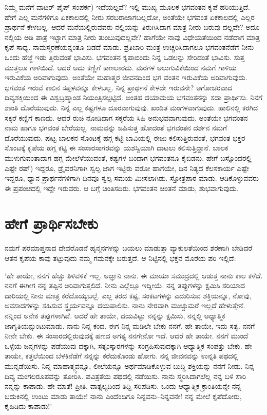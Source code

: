 ನಿಮ್ಮ ಮನೆಗೆ ವಾಟರ್ ಪೈಪ್ ಸಂಪರ್ಕ) ಇದೆಯಲ್ಲವೆ? ಇಲ್ಲಿ ಮುಖ್ಯ ಮೂಲಕ ಭಗವಂತನ ಕೃಪೆ ಹರಿಯುತ್ತಿದೆ. ಹೇಗೆ ಎಲ್ಲ ಮನೆಗಳಿಗೂ ಏಕಕಾಲದಲ್ಲಿ ನೀರು ಸರಬರಾಜಾಗಬಲ್ಲದೋ, ಅಂತೆಯೇ ಭಗವಂತ ಏಕಕಾಲದಲ್ಲಿ ಎಲ್ಲರ ಪ್ರಾರ್ಥನೆ ಕೇಳಬಲ್ಲ. ಆದರೆ ಮನೆಯಲ್ಲಿರುವವರು ನಲ್ಲಿಯನ್ನು ತಿರುಗಿಸಿದಾಗ ಮಾತ್ರ ನೀರು ಬರುವು ದಲ್ಲವೇ? ಅದೂ ನಲ್ಲಿಯ ಅಡಿ ಪಾತ್ರೆ ಇಟ್ಟಾಗ ಮಾತ್ರ ನೀರು ತುಂಬುವುದಲ್ಲವೇ? ಹಾಗೆಯೇ ನಾವು ವಿಧೇಯತೆಯಿಂದ ನಡೆದಾಗ ಮಾತ್ರ ಕೃಪೆ ಸಾಧ್ಯ. ನಾಮಸ್ಮರಣೆಯನ್ನಂತೂ ಬಿಡದೆ ಮಾಡು. ಪ್ರತಿಬಾರಿ ಮಂತ್ರ ಉಚ್ಚರಿಸಿದಾಗಲೂ ಭಗವಂತನೆಡೆಗೆ ನೀನು ಒಂದು ಹೆಜ್ಜೆ ಇಡು ತ್ತಿರುವಂತೆ ಭಾವಿಸು. ಭಗವಂತನ ಕೃಪಾಬಿಂದು ನಿನ್ನ ಒಡಲನ್ನು ಸೇರಿದಂತೆ ಭಾವಿಸು. ಸುತ್ತ ಮುತ್ತಲೂ ಗಾಳಿಯಿದೆ. ಆದರೆ ಅದು ಕಣ್ಣಿಗೆ ಕಾಣಲಾರದು. ಮರಗಳ ಅಲುಗುವಿಕೆಯಿಂದ ನಮಗೆ ಗಾಳಿಯ ಇರುವಿಕೆಯ ಅರಿವಾಗುವುದು. ಅಂತೆಯೇ ಮಹಾತ್ಮರ ಜೀವನದಿಂದ ಭಗ ವಂತನ ಇರುವಿಕೆಯ ಅರಿವಾಗುವುದು. ಭಗವಂತ ಇರುವೆ ಕಾಲಿನ ಸಪ್ಪಳವನ್ನೂ ಕೇಳಬಲ್ಲ. ನಿನ್ನ ಪ್ರಾರ್ಥನೆ ಕೇಳದೇ ಇರುವನೇ? ಅಗೋಚರವಾದ ದಿವ್ಯಶಕ್ತಿಯಿಂದ ಈ ವಿಶ್ವಬ್ರಹ್ಮಾಂಡ ನಿಯಂತ್ರಿಸಲ್ಪಟ್ಟಿದೆ. ಅಂತಹ ದಯಾಮಯ ಭಗವಂತನನ್ನು ಸದಾ ಪ್ರಾರ್ಥಿಸು. ನಿನಗೆ ಶಾಂತಿ ದೊರೆಯುವುದು. ನಿನ್ನ ಎಲ್ಲ ಕಷ್ಟಗಳೂ ದೂರವಾಗುವುವು. ಖಂಡಿತ ಮಂಗಳವಾಗುವುದು. ಹಾಲಿನಲ್ಲಿ ಕರಗಿದ ಸಕ್ಕರೆ ಕಣ್ಣಿಗೆ ಕಾಣದು. ಆದರೆ ರುಚಿ ನೋಡಿದಾಗ ಸಕ್ಕರೆಯ ಸಿಹಿ ಅನುಭವವಾಗುವುದು. ಅಂತೆಯೇ ಭಗವಂತನ ನಾಮ ಹಾಗೂ ಭಗವಂತ ಬೇರೆಯಲ್ಲ. ನಾಮವನ್ನು ಜಪಿಸುತ್ತ ಹೋದಂತೆ ಭಗವಂತನ ದರ್ಶನ ನಮಗೆ ದೊರೆಯುವುದು. ಪುಟ್ಟ ಬಾಲಕನ ಸೊಂಟಕ್ಕೆ ಹಗ್ಗ ಕಟ್ಟಿ ಬಾವಿಯಲ್ಲಿ ಈಜು ಕಲಿಸುತ್ತಿರುವಂತೆ, ಭಗವಂತ ಭಕ್ತರ ಸೊಂಟಕ್ಕೆ ಕೃಪೆಯ ಹಗ್ಗ ಕಟ್ಟಿ ಈ ಸಂಸಾರಸಾಗರವನ್ನು ಯಶಸ್ವಿಯಾಗಿ ದಾಟಲು ಕಲಿಸುತ್ತಿದ್ದಾನೆ. ಬಾಲಕ ಮುಳುಗುವಂತಾದಾಗ ಹಗ್ಗ ಮೇಲೆಳೆಯುವಂತೆ, ಕಷ್ಟಗಳ ಬಂದಾಗ ಭಗವಂತನೂ ಕೈಬಿಡನು. ಹೇಗೆ ಬಸ್ಸೊಂದರಲ್ಲಿ ಎಷ್ಟೇ ರಷ್​) ಇದ್ದರೂ, ಡ್ರೈವರನಿಗಾಗಿ ಸ್ವಲ್ಪ ಜಾಗ ಇಟ್ಟಿರು ವರೋ ಹಾಗೆಯೇ, ದಿನ ನಿತ್ಯದ ಕೆಲಸಕಾರ್ಯ ಎಷ್ಟೇ ಇದ್ದರೂ, ಧ್ಯಾನ ಪ್ರಾರ್ಥನೆಗಳಿಗಾಗಿ ದಿನವೂ ಸ್ವಲ್ಪ ಸಮಯ ಮೀಸಲಾಗಿಡು. ಸ್ತೋತ್ರಪಾಠ ಮಾಡು. ಆಡಿಕೊಳ್ಳುವವರು ಈ ಪ್ರಪಂಚದಲ್ಲಿ ಇದ್ದೇ ಇರುವರು. ಆ ಬಗ್ಗೆ ಚಿಂತಿಸದಿರು. ಭಗವಂತನ ಚಿಂತನೆ ಮಾಡು, ಶುಭವಾಗುವುದು.


\section{ಹೇಗೆ ಪ್ರಾರ್ಥಿಸಬೇಕು}

ನಮಗೆ ಪರಮಾಪ್ತನಾದ ದೇವರೊಡನೆ ಹೃನ್ಮನಗಳನ್ನು ಬಯಲು ಮಾಡುತ್ತಾ ವ್ಯಾಕುಲತೆಯಿಂದ ಶರಣಾಗಿ ಬೇಡಿದರೆ ಆತನ ಕೃಪೆಯ ಕಾವು ತಟ್ಟುವುದು ನಮ್ಮ ಗಮನಕ್ಕೇ ಬರುತ್ತದೆ. ಆ ನಿಟ್ಟಿನಲ್ಲಿ ಭಕ್ತನ ಮೊರೆಯ ಪರಿ ಇಲ್ಲಿದೆ:

‘ಹೇ ತಾಯೇ, ನನಗೆ ಹೆಚ್ಚು ತಿಳಿವಳಿಕೆ ಇಲ್ಲ. ಅಜ್ಞಾನಿ ನಾನು. ಈ ಮಾಯಾ ಸಮುದ್ರದಲ್ಲಿ ಆಡುತ್ತ ನಾನು ಕಾಲ ಕಳೆದೆ. ನನಗೆ ಈಗೀಗ ನನ್ನ ತಪ್ಪಿನ ಅರಿವಾಗುತ್ತಲಿದೆ. ನೀನು ಎಲ್ಲೆಲ್ಲೂ ಇದ್ದೀಯೆ. ನನ್ನ ತಪ್ಪುಗಳನ್ನು ಕ್ಷಮಿಸಿ ಸರಿಯಾದ ದಾರಿಯಲ್ಲಿ ನೀನು ಮಾತ್ರ ಕರೆದೊಯ್ಯಬಲ್ಲೆ. ಎಲ್ಲ ತರದ ಕಷ್ಟ, ಸಂಕಟಗಳನ್ನು ಎದುರಿಸುವ ಶಕ್ತಿಯನ್ನೂ, ನೋವು, ಅವಸಾದಗಳನ್ನು ಸಹಿಸುವ ಸ್ಥೈರ್ಯವನ್ನೂ ದಯಪಾಲಿಸು. ನಾನು ನೇರವಾಗಿ ಮುಚ್ಚುಮರೆ ಇಲ್ಲದೆ ಹೇಳುತ್ತೇನೆ. ನನ್ನಿಂದ ಅನೇಕ ತಪ್ಪುಗಳಾಗಿವೆ. ಆದರೆ ಹೇ ತಾಯೇ, ದಯವಿಟ್ಟು ನನ್ನನ್ನು ಕ್ಷಮಿಸು, ನನ್ನಲ್ಲಿ ಆಧ್ಯಾತ್ಮಿಕ ಜಾಗೃತಿಯನ್ನುಂಟುಮಾಡು. ನಾನು ನಿನ್ನ ಕಂದ. ಈಗ ನಿನ್ನ ಮಡಿಲೇ ಬೇಕು ನನಗೆ. ಹೇ ತಾಯೇ, ಇದು ಸತ್ಯ. ನನಗೆ ನೀನೇ ಬೇಕು. ಈ ಸಂಸಾರದಲ್ಲಿರುವುದಕ್ಕೆ ಹಣದ ಅಗತ್ಯ ನನಗೇನೋ ಇದೆ. ಆದರೆ ಹೇ ತಾಯೇ. ನನಗೆ ಮುಂದೆ ಒಳ್ಳೆಯ ಜನ್ಮಗಳನ್ನು ಪಡೆಯುವು ದಕ್ಕಾಗಿ, ಸತ್ಸಂಸ್ಕಾರಗಳನ್ನು ಸಂಗ್ರಹಿಸುವುದಕ್ಕಾಗಿ ಆಧ್ಯಾತ್ಮಿಕ ಸಂಪತ್ತು ಬೇಕು. ಹೇ ತಾಯೇ, ಕತ್ತಲೆಯಿಂದ ಬೆಳಕಿನೆಡೆಗೆ ನನ್ನನ್ನು ಕರೆದುಕೊಂಡು ಹೋಗು. ನನ್ನ ಜೀವನವನ್ನು ಉನ್ನತಿ ಪಥದಲ್ಲಿ ಮುನ್ನಡೆಯಿಸು. ನಿನ್ನ ಮಾಹಾತ್ಮ್ಯವನ್ನೂ, ಲೀಲೆಯನ್ನೂ ಅರ್ಥಮಾಡಿಕೊಳ್ಳುವ ಬುದ್ಧಿ ಶಕ್ತಿಯನ್ನು ನನಗೆ ನೀಡು. ನಿನ್ನ ದಿವ್ಯ ಮಂಗಲರೂಪವನ್ನು ತೋರಿಸಿ. ಪವಿತ್ರತೆಯ ಪಥದಲ್ಲಿ ನಡೆಯಿಸು. ನಾನು ಸ್ಮರಿಸಿದಾಗಲೆಲ್ಲ ನನ್ನ ಬಳಿ ಸಾರಿ ನನ್ನನ್ನು ಕಾಪಾಡು. ಹೇ ಮಾತೆ! ಪ್ರೀತಿ, ವಾತ್ಸಲ್ಯದಿಂದ ತಿದ್ದಿ ಸರಿಪಡಿಸು. ಒಂದು ಆಧ್ಯಾತ್ಮಿಕ ಕ್ರಾಂತಿಯನ್ನೇ ನನ್ನ ಬದುಕಿನಲ್ಲಿ ಉಂಟು ಮಾಡು ತಾಯೇ! ನಾನು ಎಂದೆಂದಿಗೂ ನಿನ್ನವನು–ನಿನ್ನವನೇ! ನನ್ನ ಮೇಲೆ ಕೃಪೆದೋರು, ಕೈಹಿಡಿದು ಕಾಪಾಡು!’

